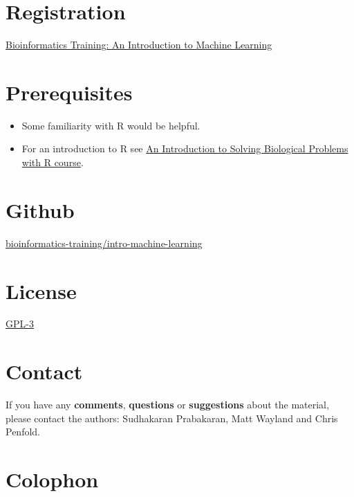 \documentclass[]{book}
\providecommand{\tightlist}{%
  \setlength{\itemsep}{0pt}\setlength{\parskip}{0pt}}
\theoremstyle{definition}
\theoremstyle{definition}
\theoremstyle{definition}
\theoremstyle{remark}
\begin{document}
\section{Registration}\label{registration}

\href{https://training.csx.cam.ac.uk/bioinformatics/search?type=events\&query=an+introduction+to+machine+learning\&x=0\&y=0}{Bioinformatics
Training: An Introduction to Machine Learning}

\section{Prerequisites}\label{prerequisites}

\begin{itemize}
\tightlist
\item
  Some familiarity with R would be helpful.
\item
  For an introduction to R see
  \href{http://training.csx.cam.ac.uk/bioinformatics/course/bioinfo-rintro/}{An
  Introduction to Solving Biological Problems with R course}.
\end{itemize}

\section{Github}\label{github}

\href{https://github.com/bioinformatics-training/intro-machine-learning}{bioinformatics-training/intro-machine-learning}

\section{License}\label{license}

\href{https://www.gnu.org/licenses/gpl-3.0.en.html}{GPL-3}

\section{Contact}\label{contact}

If you have any \textbf{comments}, \textbf{questions} or
\textbf{suggestions} about the material, please contact the authors:
Sudhakaran Prabakaran, Matt Wayland and Chris Penfold.

\section{Colophon}\label{colophon}
\end{document}
